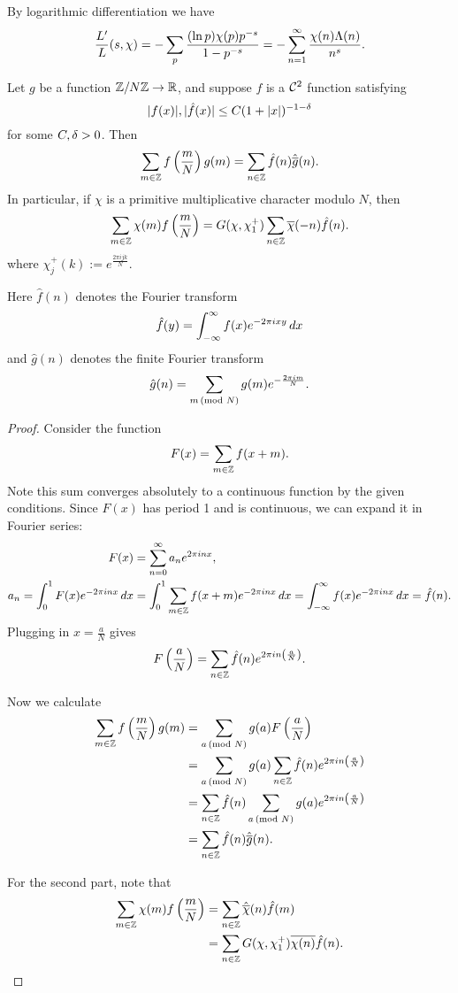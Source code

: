 By logarithmic differentiation we have
\[
\frac{L'}{L}(s,\chi)=-\sum_{p}\fc{(\ln p)\chi(p)p^{-s}}{1-p^{-s}}=-\sum_{n=1}^{\iy} \fc{\chi(n)\La(n)}{n^s}.
\]
\begin{thm}
Let $g$ be a function $\Z/N\Z\to \R$, and suppose $f$ is a $\cal C^2$ function satisfying
\[
|f(x)|,|\hat{f}(x)|\le C(1+|x|)^{-1-\de}
\]
for some $C,\de>0$. Then
\[
\sum_{m\in \Z} f\pf mN g(m)=\sum_{n\in \Z} \hat{f}(n) \hat{\ol{g}}(n).
\]
In particular, if $\chi$ is a primitive multiplicative character modulo $N$, then
\[
\sum_{m\in \Z} \chi(m)f\pf mN=G(\chi,\chi^+_1)\sum_{n\in \Z} \ol{\chi}(-n) \hat{f}(n).
\]
where $\chi^+_j(k):=e^{\frac{2\pi ijk}{N}}$.
\end{thm}
Here $\hat{f}(n)$ denotes the Fourier transform
\[
\hat{f}(y)=\int_{-\iy}^{\iy} f(x)e^{-2\pi ixy}\,dx
\]
and $\hat{g}(n)$ denotes the finite Fourier transform
\[
\hat{g}(n)=\sum_{m\md N} g(m)e^{-\frac{2\pi im}N}.
\]
\begin{proof}
Consider the function 
\[
F(x)=\sum_{m\in \Z} f(x+m).
\]
Note this sum converges absolutely to a continuous function by the given conditions. 
Since $F(x)$ has period 1 and is continuous, we can expand it in Fourier series:
\begin{align*}
F(x)&=\sum_{n=0}^{\iy} a_n e^{2\pi in x},
\\
a_n=\int_0^1 F(x)e^{-2\pi i nx}\,dx
&=\int_0^1 \sum_{m\in \Z} f(x+m) e^{-2\pi i nx}\,dx
=\int_{-\iy}^{\iy} f(x)e^{-2\pi inx}\,dx=\hat{f}(n).
\end{align*}
Plugging in $x=\frac aN$ gives 
\[
F\pf aN= \sum_{n\in \Z} \hat{f}(n)e^{2\pi i n\pf aN}.
\]

Now we calculate
\begin{align*}
\sum_{m\in \Z} f\pf mN g(m)&=\sum_{a\md N} g(a)F\pf aN\\
&=\sum_{a\md N} g(a)\sum_{n\in \Z} \hat{f}(n)e^{2\pi in\pf aN}\\
&=\sum_{n\in \Z} \hat{f}(n)\sum_{a\md N} g(a) e^{2\pi in\pf aN}\\
&=\sum_{n\in \Z} \hat{f}(n)\hat{\ol{g}}(n).
\end{align*}

For the second part, note that
\begin{align*}
\sum_{m\in \Z}\chi(m)f\pf mN
&=\sum_{n\in \Z}\hat{\ol{\chi}}(n) \hat{f}(m)\\
&=\sum_{n\in \Z} G(\chi,\chi^+_1)\ol{\chi(n)}\hat{f}(n).\qedhere %
\end{align*}
\end{proof}
